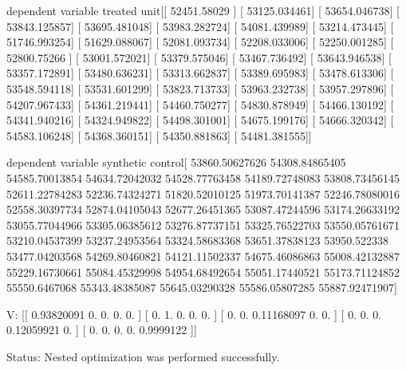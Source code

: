 dependent variable treated unit[[ 52451.58029 ]
 [ 53125.034461]
 [ 53654.046738]
 [ 53843.125857]
 [ 53695.481048]
 [ 53983.282724]
 [ 54081.439989]
 [ 53214.473445]
 [ 51746.993254]
 [ 51629.088067]
 [ 52081.093734]
 [ 52208.033006]
 [ 52250.001285]
 [ 52800.75266 ]
 [ 53001.572021]
 [ 53379.575046]
 [ 53467.736492]
 [ 53643.946538]
 [ 53357.172891]
 [ 53480.636231]
 [ 53313.662837]
 [ 53389.695983]
 [ 53478.613306]
 [ 53548.594118]
 [ 53531.601299]
 [ 53823.713733]
 [ 53963.232738]
 [ 53957.297896]
 [ 54207.967433]
 [ 54361.219441]
 [ 54460.750277]
 [ 54830.878949]
 [ 54466.130192]
 [ 54341.940216]
 [ 54324.949822]
 [ 54498.301001]
 [ 54675.199176]
 [ 54666.320342]
 [ 54583.106248]
 [ 54368.360151]
 [ 54350.881863]
 [ 54481.381555]]

dependent variable synthetic control[ 53860.50627626  54308.84865405  54585.70013854  54634.72042032
  54528.77763458  54189.72748083  53808.73456145  52611.22784283
  52236.74324271  51820.52010125  51973.70141387  52246.78080016
  52558.30397734  52874.04105043  52677.26451365  53087.47244596
  53174.26633192  53055.77044966  53305.06385612  53276.87737151
  53325.76522703  53550.05761671  53210.04537399  53237.24953564
  53324.58683368  53651.37838123  53950.522338    53477.04203568
  54269.80460821  54121.11502337  54675.46086863  55008.42132887
  55229.16730661  55084.45329998  54954.68492654  55051.17440521
  55173.71124852  55550.6467068   55343.48385087  55645.03290328
  55586.05807285  55887.92471907]

 V:
[[ 0.93820091  0.          0.          0.          0.        ]
 [ 0.          1.          0.          0.          0.        ]
 [ 0.          0.          0.11168097  0.          0.        ]
 [ 0.          0.          0.          0.12059921  0.        ]
 [ 0.          0.          0.          0.          0.9999122 ]]

 Status:
Nested optimization was performed successfully.